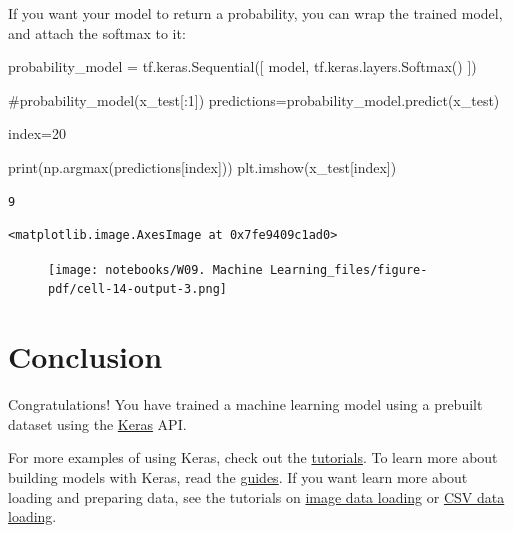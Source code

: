 \documentclass[
  letterpaper,
  DIV=11,
  numbers=noendperiod]{scrreprt}
\newenvironment{Shaded}{\begin{snugshade}}{\end{snugshade}}
\newcommand{\BuiltInTok}[1]{\textcolor[rgb]{0.00,0.23,0.31}{#1}}
\newcommand{\CommentTok}[1]{\textcolor[rgb]{0.37,0.37,0.37}{#1}}
\newcommand{\DecValTok}[1]{\textcolor[rgb]{0.68,0.00,0.00}{#1}}
\newcommand{\NormalTok}[1]{\textcolor[rgb]{0.00,0.23,0.31}{#1}}
\newcommand{\OperatorTok}[1]{\textcolor[rgb]{0.37,0.37,0.37}{#1}}
\begin{document}
If you want your model to return a probability, you can wrap the trained
model, and attach the softmax to it:

\begin{Shaded}
\begin{Highlighting}[]
\NormalTok{probability\_model }\OperatorTok{=}\NormalTok{ tf.keras.Sequential([}
\NormalTok{  model,}
\NormalTok{  tf.keras.layers.Softmax()}
\NormalTok{])}
\end{Highlighting}
\end{Shaded}

\begin{Shaded}
\begin{Highlighting}[]
\CommentTok{\#probability\_model(x\_test[:1])}
\NormalTok{predictions}\OperatorTok{=}\NormalTok{probability\_model.predict(x\_test)}

\NormalTok{index}\OperatorTok{=}\DecValTok{20}

\BuiltInTok{print}\NormalTok{(np.argmax(predictions[index]))}
\NormalTok{plt.imshow(x\_test[index])}
\end{Highlighting}
\end{Shaded}

\begin{verbatim}
9
\end{verbatim}

\begin{verbatim}
<matplotlib.image.AxesImage at 0x7fe9409c1ad0>
\end{verbatim}

\begin{figure}[H]

{\centering \texttt{[image: notebooks/W09. Machine Learning\_files/figure-pdf/cell-14-output-3.png]}

}

\end{figure}

\hypertarget{conclusion}{%
\section{Conclusion}\label{conclusion}}

Congratulations! You have trained a machine learning model using a
prebuilt dataset using the
\href{https://www.tensorflow.org/guide/keras/overview}{Keras} API.

For more examples of using Keras, check out the
\href{https://www.tensorflow.org/tutorials/keras/}{tutorials}. To learn
more about building models with Keras, read the
\href{https://www.tensorflow.org/guide/keras}{guides}. If you want learn
more about loading and preparing data, see the tutorials on
\href{https://www.tensorflow.org/tutorials/load_data/images}{image data
loading} or
\href{https://www.tensorflow.org/tutorials/load_data/csv}{CSV data
loading}.
\end{document}
